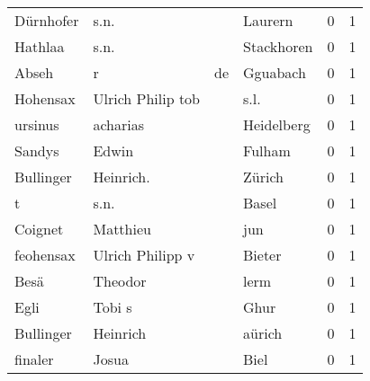 \documentclass[10pt,a4paper,landscape]{article}
\begin{document}
\begin{longtable}{llllrr}
                Dürnhofer &                               s.n. &             &                                     Laurern &          0 &         1 \\
                  Hathlaa &                               s.n. &             &                                  Stackhoren &          0 &         1 \\
                    Abseh &                                  r &          de &                                    Gguabach &          0 &         1 \\
                 Hohensax &                  Ulrich Philip tob &             &                                        s.l. &          0 &         1 \\
                  ursinus &                           acharias &             &                                  Heidelberg &          0 &         1 \\
                   Sandys &                              Edwin &             &                                      Fulham &          0 &         1 \\
                Bullinger &                          Heinrich. &             &                                      Zürich &          0 &         1 \\
                        t &                               s.n. &             &                                       Basel &          0 &         1 \\
                  Coignet &                           Matthieu &             &                                         jun &          0 &         1 \\
                feohensax &                   Ulrich Philipp v &             &                                      Bieter &          0 &         1 \\
                     Besä &                            Theodor &             &                                        lerm &          0 &         1 \\
                     Egli &                             Tobi s &             &                                        Ghur &          0 &         1 \\
                Bullinger &                           Heinrich &             &                                      aürich &          0 &         1 \\
                  finaler &                              Josua &             &                                        Biel &          0 &         1 \\

\end{longtable}
\end{document}
